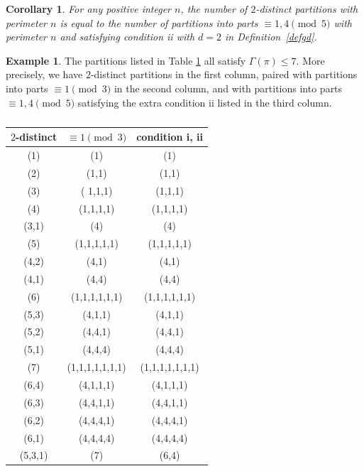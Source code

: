 \documentclass[12pt]{amsart}
\numberwithin{equation}{section}
\theoremstyle{plain}
\newtheorem{corollary}[theorem]{Corollary}
\theoremstyle{definition}
\newtheorem{example}[theorem]{Example}
\begin{document}
\begin{corollary}
For any positive integer $n$, the number of $2$-distinct partitions with perimeter $n$ is equal to the number of partitions into parts $\equiv 1,4 \pmod 5$ with perimeter $n$ and satisfying condition ii with $d=2$ in Definition~\ref{defgd}.
\end{corollary}
\begin{example}
The partitions listed in Table \ref{tab4} all satisfy $\Gamma(\pi)\leq 7$. More precisely, we have $2$-distinct partitions in the first column, paired with partitions into parts $\equiv 1\pmod{3}$ in the second column, and with partitions into parts $\equiv 1,4 \pmod{5}$ satisfying the extra condition ii listed in the third column.
\end{example}
\begin{table}[htbp]\caption{}
\centering
\begin{tabular}{|c|c|c|}
\hline
$2$-distinct & $\equiv 1 \pmod 3$ & condition i, ii\\
\hline
(1) & (1) & (1)\\
\hline
(2) & (1,1) & (1,1)\\
\hline
(3) &( 1,1,1) & (1,1,1)\\
\hline
(4) & (1,1,1,1) & (1,1,1,1)\\
(3,1) & (4) & (4)\\
\hline
(5) & (1,1,1,1,1) & (1,1,1,1,1)\\
(4,2) & (4,1) & (4,1)\\
(4,1) & (4,4) & (4,4)\\
\hline
(6) & (1,1,1,1,1,1) & (1,1,1,1,1,1)\\
(5,3) & (4,1,1) & (4,1,1)\\
(5,2) & (4,4,1) & (4,4,1)\\
(5,1) & (4,4,4) & (4,4,4)\\
\hline
(7) & (1,1,1,1,1,1,1) & (1,1,1,1,1,1,1)\\
(6,4) & (4,1,1,1) & (4,1,1,1)\\
(6,3) & (4,4,1,1) & (4,4,1,1)\\
(6,2) & (4,4,4,1) & (4,4,4,1)\\
(6,1) & (4,4,4,4) & (4,4,4,4)\\
(5,3,1) & (7) & (6,4)\\
\hline
\end{tabular}
\label{tab4}
\end{table}

\end{document}
